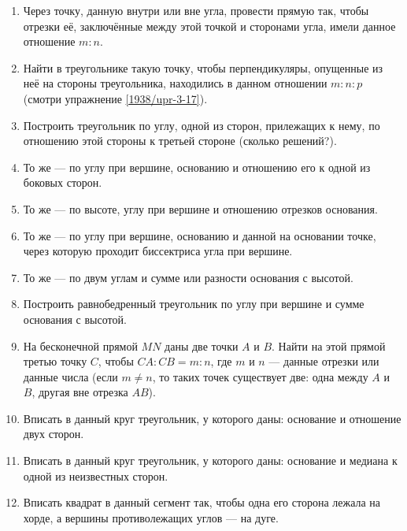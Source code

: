 \documentclass[oneside]{book}
\begin{document}
\begin{center}
\end{center}

\begin{enumerate}[resume]

 \item
Через точку, данную внутри или вне угла, провести прямую так, чтобы отрезки её, заключённые между этой точкой и сторонами угла, имели данное отношение $m:n$.

 \item
Найти в треугольнике такую точку, чтобы перпендикуляры, опущенные из неё на стороны треугольника, находились в данном отношении $m:n:p$ (смотри упражнение \ref{1938/upr-3-17}).

 \item
Построить треугольник по углу, одной из сторон, прилежащих к нему, по отношению этой стороны к третьей стороне (сколько решений?).

 \item
То же — по углу при вершине, основанию и отношению его к одной из боковых сторон.

 \item
То же — по высоте, углу при вершине и отношению отрезков основания.

 \item
То же — по углу при вершине, основанию и данной на основании точке, через которую проходит биссектриса угла при вершине.

 \item
То же — по двум углам и сумме или разности основания с высотой.

 \item
Построить равнобедренный треугольник по углу при вершине и сумме основания с высотой.

 \item
На бесконечной прямой $MN$ даны две точки $A$ и $B$.
Найти на этой прямой третью точку $C$, чтобы $CA:CB=m:n$, где $m$ и $n$ — данные отрезки или данные числа (если $m\ne n$, то таких точек существует две:
одна между $A$ и $B$, другая вне отрезка $AB$).

 \item
Вписать в данный круг треугольник, у которого даны:
основание и отношение двух сторон.

 \item
Вписать в данный круг треугольник, у которого даны:
основание и медиана к одной из неизвестных сторон. 

 \item
Вписать квадрат в данный сегмент так, чтобы одна его сторона лежала на хорде, а вершины противолежащих углов — на дуге.


\end{enumerate}
\end{document}
